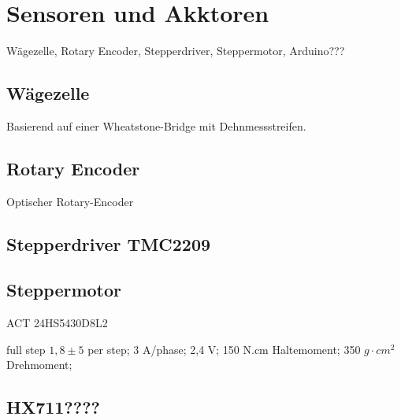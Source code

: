 \section{Sensoren und Akktoren}
\label{sec:Sensoren_Akktoren}

Wägezelle, Rotary Encoder, Stepperdriver, Steppermotor, Arduino???

\subsection{Wägezelle}
\label{subsec:sensor_waegezelle}

Basierend auf einer Wheatstone-Bridge mit Dehnmessstreifen.
\subsection{Rotary Encoder}
\label{subsec:sensor_rotary-encoder}

Optischer Rotary-Encoder
\subsection{Stepperdriver TMC2209}
\label{subsec:sensor_driver}


\subsection{Steppermotor}
\label{subsec:sensor_motor}

ACT 24HS5430D8L2

full step $1,8 \pm 5$ per step;
3 A/phase;
2,4 V;
150 N.cm Haltemoment;
350 $g \cdot cm^2$ Drehmoment;

\subsection{HX711????}
\label{subsec:sensor_hx711}